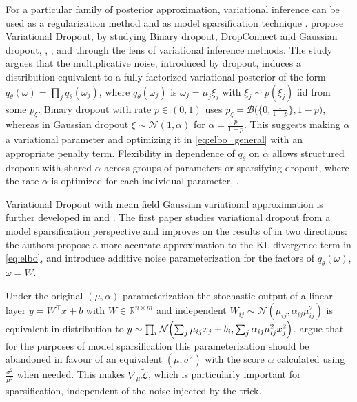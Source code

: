 \documentclass[a4paper,10pt]{article}
\begin{document}
For a particular family of posterior approximation, variational inference can be used
as a regularization method \cite{kingma_variational_2015} and as model sparsification
technique \cite{molchanov_variational_2017}. \cite{kingma_variational_2015} propose
Variational Dropout, by studying Binary dropout, DropConnect and Gaussian dropout,
\cite{hinton_improving_2012,wan_regularization_2013}, \cite{srivastava_dropout_2014},
and \cite{wang_fast_2013} through the lens of variational inference methods. The study
argues that the multiplicative noise, introduced by dropout, induces a distribution
equivalent to a fully factorized variational posterior of the form $
  q_\theta(\omega) = \prod_j q_{\theta}(\omega_j)
$, where $q_{\theta}(\omega_j)$ is $\omega_j = \mu_j \xi_j$ with $\xi_j \sim p(\xi_j)$
iid from some $p_\xi$. Binary dropout with rate $p \in (0, 1)$ uses $
  p_\xi
    = \mathcal{B}\bigl(
      \{0, \tfrac1{1-p}\}, 1-p
    \bigr)
$, whereas in Gaussian dropout $
  \xi \sim \mathcal{N}(1, \alpha)
$ for $\alpha = \tfrac{p}{1-p}$. This suggests making $\alpha$ a variational parameter
and optimizing it in \eqref{eq:elbo_general} with an appropriate penalty term. Flexibility
in dependence of $q_\theta$ on $\alpha$ allows structured dropout with shared $\alpha$
across groups of parameters or sparsifying dropout, where the rate $\alpha$ is optimized
for each individual parameter, \cite{molchanov_variational_2017}.

Variational Dropout with mean field Gaussian variational approximation is further developed
in \cite{molchanov_variational_2017} and \cite{kharitonov_variational_2018}. The first paper
studies variational dropout from a model sparsification perspective and improves on the
results of \cite{kingma_variational_2015} in two directions: the authors propose a more
accurate approximation to the KL-divergence term in \eqref{eq:elbo}, and introduce additive
noise parameterization for the factors of $q_\theta(\omega)$, $\omega = W$.

Under the original $(\mu, \alpha)$ parameterization the stochastic output of a linear
layer $
  y = W^\top x + b
$ with $
  W \in \mathbb{R}^{n\times m}
$ and independent $
  W_{ij} \sim \mathcal{N}(\mu_{ij}, \alpha_{ij} \mu_{ij}^2)
$ is equivalent in distribution to $
  y \sim \prod_i \mathcal{N}\Bigl(
      \sum_j \mu_{ij} x_j + b_i,
      \sum_j \alpha_{ij} \mu_{ij}^2 x_j^2
  \Bigr)
$. \cite{molchanov_variational_2017} argue that for the purposes of model sparsification
this parameterization should be abandoned in favour of an equivalent $(\mu, \sigma^2)$ with
the score $\alpha$ calculated using $\tfrac{\sigma^2}{\mu^2}$ when needed. This makes $
  \nabla_\mu \tilde{\mathcal{L}}
$, which is particularly important for sparsification, independent of the noise injected
by the trick.
\end{document}
